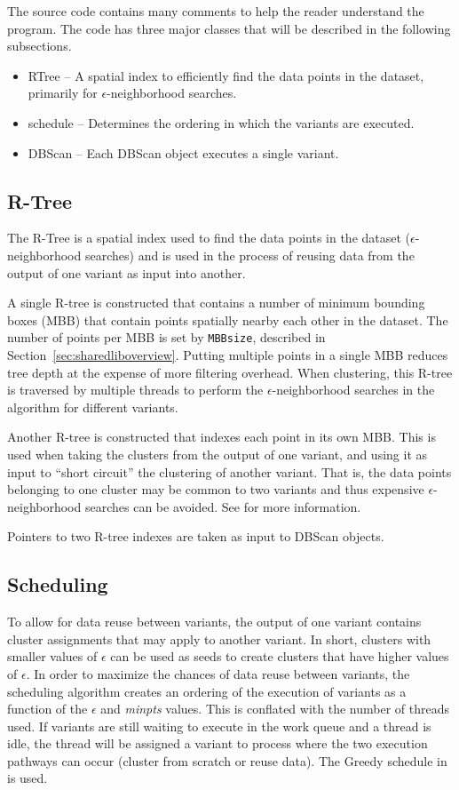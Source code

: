 \documentclass[12pt]{article}
\def\eps{$\epsilon$\xspace}
\def\minpts{\emph{minpts}\xspace}
\begin{document}
The source code contains many comments to help the reader understand the program. The code has three major classes that will be described in the following subsections. 
\begin{itemize}
\item RTree -- A spatial index to efficiently find the data points in the dataset, primarily for $\epsilon$-neighborhood searches.
\item schedule -- Determines the ordering in which the variants are executed.
\item DBScan -- Each DBScan object executes a single variant.
\end{itemize}

\subsection{R-Tree}
The R-Tree is a spatial index used to find the data points in the dataset (\eps-neighborhood searches) and is used in the process of reusing data from the output of one variant as input into another. 

A single R-tree is constructed that contains a number of minimum bounding boxes (MBB) that contain points spatially nearby each other in the dataset. The number of points per MBB is set by \texttt{MBBsize}, described in Section~\ref{sec:sharedliboverview}.   Putting multiple points in a single MBB reduces tree depth at the expense of more filtering overhead.  When clustering, this R-tree is traversed by multiple threads to perform the \eps-neighborhood searches in the algorithm for different variants.

Another R-tree is constructed that indexes each point in its own MBB. This is used when taking the clusters from the output of one variant, and using it as input to ``short circuit'' the clustering of another variant. That is, the data points belonging to one cluster may be common to two variants and thus expensive \eps-neighborhood searches can be avoided. See \cite{Gowanlock2016} for more information.

Pointers to two R-tree indexes are taken as input to DBScan objects.

\subsection{Scheduling}
To allow for data reuse between variants, the output of one variant contains cluster assignments that may apply to another variant. In short, clusters with smaller values of \eps can be used as seeds to create clusters that have higher values of \eps. In order to maximize the chances of data reuse between variants, the scheduling algorithm creates an ordering of the execution of variants as a function of the \eps and \minpts values.  This is conflated with the number of threads used. If variants are still waiting to execute in the work queue and a thread is idle, the thread will be assigned a variant to process where the two execution pathways can occur (cluster from scratch or reuse data).  The Greedy schedule in~\cite{Gowanlock2016} is used. 
\end{document}
